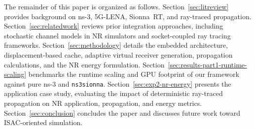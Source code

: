 The remainder of this paper is organized as follows.
Section~\ref{sec:litreview} provides background on ns-3, 5G-LENA, Sionna~RT, and ray-traced propagation.
Section~\ref{sec:relatedwork} reviews prior integration approaches, including stochastic channel models in NR simulators and socket-coupled ray tracing frameworks.
Section~\ref{sec:methodology} details the embedded architecture, displacement-based cache, adaptive virtual receiver generation, propagation calculations, and the NR energy formulation.
Section~\ref{sec:results-part1-runtime-scaling} benchmarks the runtime scaling and GPU footprint of our framework against pure ns-3 and \texttt{ns3sionna}.
Section~\ref{sec:exp2-nr-energy} presents the application case study, evaluating the impact of deterministic ray-traced propagation on NR application, propagation, and energy metrics.
Section~\ref{sec:conclusion} concludes the paper and discusses future work toward ISAC-oriented simulation.
